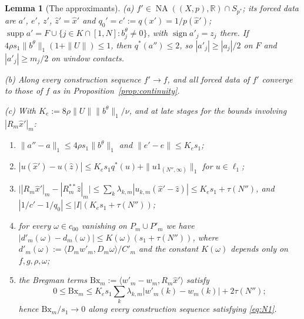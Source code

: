 \documentclass[10pt]{amsart}
\newtheorem{lemma}[theorem]{Lemma}
\theoremstyle{definition}
\theoremstyle{remark}
\newcommand{\NA}{\operatorname{NA}}
\newcommand{\supp}{\operatorname{supp}}
\newcommand{\sgn}{\operatorname{sign}}
\newcommand{\R}{\mathbb R}
\newcommand{\zh}{\hat z}
\newcommand{\ip}[2]{\langle #1,#2\rangle}
\begin{document}
\begin{lemma}[The approximants]\label{lem:approxfacts}
\textup{(a)} $f'\in\NA((X,p),\R)\cap S_{p^*}$; its forced data are $a'$,
$e'$, $z'$, $\zh'=\hat x'$ and $q_0'=c':=q(x')=1/p(\hat x')$;
$\supp a'=F\cup\{j\in K\cap[1,N]:b^\theta_j\ne0\}$, with $\sgn a'_j=z_j$
there.  If $4\rho s_1\|b^\theta\|_1(1+\|U\|)\le1$, then $q^*(a'')\le2$, so
$|a'_j|\ge|a_j|/2$ on $F$ and $|a'_j|\ge m_j/2$ on window contacts.

\textup{(b)} Along every construction sequence $f'\to f$, and all forced data
of $f'$ converge to those of $f$ as in Proposition~\ref{prop:continuity}.

\textup{(c)} With $K_e:=8\rho\|U\|\|b^\theta\|_1/\nu$, and at late stages
for the bounds involving $|R_m\hat x'|_m$:
\begin{enumerate}
\item[(E1)] $\|a''-a\|_1\le4\rho s_1\|b^\theta\|_1$ and $\|e'-e\|\le K_es_1$;
\item[(E2)] $|u(\hat x')-u(\zh)|\le K_es_1q^*(u)+\|u1_{(N'',\infty)}\|_1$ for
$u\in\ell_1$;
\item[(E3)] $\big||R_m\hat x'|_m-|R_m^{**}\zh|_m\big|\le\sum_k\lambda_{k,m}
|u_{k,m}(\hat x'-\zh)|\le K_es_1+\tau(N'')$, and
$|1/c'-1/q_0|\le|I|(K_es_1+\tau(N''))$;
\item[(E4)] for every $\omega\in c_{00}$ vanishing on $P_m\cup P'_m$ we
have $|d'_m(\omega)-d_m(\omega)|\le K(\omega)(s_1+\tau(N''))$, where
$d'_m(\omega):=\ip{D_mw'_m}{D_m\omega}/C'_m$ and the constant $K(\omega)$
depends only on $f,g,\rho,\omega$;
\item[(E5)] the \emph{Bregman terms} $\mathrm{Bx}_m:=\ip{w'_m-w_m}{R_m\hat x'}$
satisfy
\[
 0\le\mathrm{Bx}_m\le K_es_1\sum_k\lambda_{k,m}|w'_m(k)-w_m(k)|+2\tau(N'');
\]
hence $\mathrm{Bx}_m/s_1\to0$ along every construction
sequence satisfying \eqref{eq:N1}.
\end{enumerate}
\end{lemma}
\end{document}
